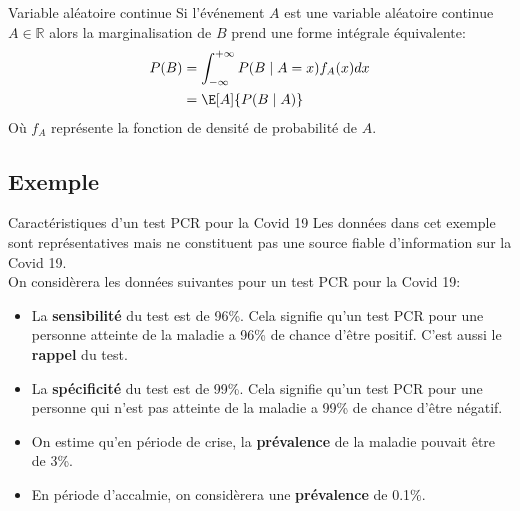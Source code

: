 \begin{frame}{Variable aléatoire continue}
	Si l'événement $A$ est une variable aléatoire continue $A \in \mathbb{R}$ alors la marginalisation de $B$ prend une forme intégrale équivalente:
	\begin{equation}
		\begin{aligned}
			P(B) &= \int_{-\infty}^{+\infty} P(B \mid A=x) f_A(x) dx \\
			&= \E[A]{P(B \mid A)}
		\end{aligned}
		\nonumber
	\end{equation}
	Où $f_A$ représente la fonction de densité de probabilité de $A$.
\end{frame}

\subsection{Exemple}

\begin{frame}{Caractéristiques d'un test PCR pour la Covid 19}
	\faExclamationTriangle Les données dans cet exemple sont représentatives mais ne constituent pas une source fiable d'information sur la Covid 19. \\
	\vspace{0.5cm}
	\pause
	On considèrera les données suivantes pour un test PCR pour la Covid 19:
	\begin{itemize}
		\item La \textbf{sensibilité} du test est de 96\%. Cela signifie qu'un test PCR pour une personne atteinte de la maladie a 96\% de chance d'être positif. C'est aussi le \textbf{rappel} du test.
		\pause
		\item La \textbf{spécificité} du test est de 99\%. Cela signifie qu'un test PCR pour une personne qui n'est pas atteinte de la maladie a 99\% de chance d'être négatif.
		\pause
		\item On estime qu'en période de crise, la \textbf{prévalence} de la maladie pouvait être de 3\%.
		\pause
		\item En période d'accalmie, on considèrera une \textbf{prévalence} de 0.1\%.
	\end{itemize}
\end{frame}

